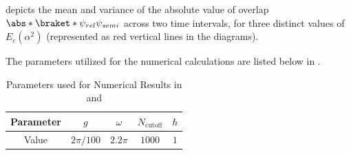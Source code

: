 depicts the mean and variance of the absolute value of overlap \(\abs*{\braket*{\psi_{rel}}{\psi_{semi}}}\) across two time intervals, for three distinct values of \(E_c(\alpha^2)\) (represented as red vertical lines in the diagrams). 

The parameters utilized for the numerical calculations are listed below in .
\begin{table}[!ht]
    \centering
        \begin{tabular}{|c|c|c|c|c|}
            \hline
            Parameter & $g$ & $\omega$ & $N_{\text{cutoff}}$ & $\hbar$ \\
            \hline
            Value & $2\pi/100$ & $2.2\pi$ & $1000$ & $1$ \\
            \hline
        \end{tabular}
    \caption{Parameters used for Numerical Results in  and 
    }
    \label{tab:numerical_values_linear}
\end{table}


